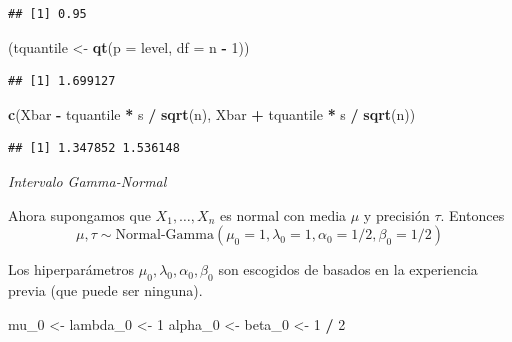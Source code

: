 \documentclass[
  12pt,
]{book}
\newenvironment{Shaded}{\begin{snugshade}}{\end{snugshade}}
\newcommand{\DataTypeTok}[1]{\textcolor[rgb]{0.13,0.29,0.53}{#1}}
\newcommand{\DecValTok}[1]{\textcolor[rgb]{0.00,0.00,0.81}{#1}}
\newcommand{\KeywordTok}[1]{\textcolor[rgb]{0.13,0.29,0.53}{\textbf{#1}}}
\newcommand{\NormalTok}[1]{#1}
\newcommand{\OperatorTok}[1]{\textcolor[rgb]{0.81,0.36,0.00}{\textbf{#1}}}
\newcommand{\StringTok}[1]{\textcolor[rgb]{0.31,0.60,0.02}{#1}}
\begin{document}
\begin{verbatim}
## [1] 0.95
\end{verbatim}

\begin{Shaded}
\begin{Highlighting}[]
\NormalTok{(tquantile \textless{}{-}}\StringTok{ }\KeywordTok{qt}\NormalTok{(}\DataTypeTok{p =}\NormalTok{ level, }\DataTypeTok{df =}\NormalTok{ n }\OperatorTok{{-}}\StringTok{ }\DecValTok{1}\NormalTok{))}
\end{Highlighting}
\end{Shaded}

\begin{verbatim}
## [1] 1.699127
\end{verbatim}

\begin{Shaded}
\begin{Highlighting}[]
\KeywordTok{c}\NormalTok{(Xbar }\OperatorTok{{-}}\StringTok{ }\NormalTok{tquantile }\OperatorTok{*}\StringTok{ }\NormalTok{s }\OperatorTok{/}\StringTok{ }\KeywordTok{sqrt}\NormalTok{(n), Xbar }\OperatorTok{+}\StringTok{ }\NormalTok{tquantile }\OperatorTok{*}\StringTok{ }\NormalTok{s }\OperatorTok{/}\StringTok{ }\KeywordTok{sqrt}\NormalTok{(n))}
\end{Highlighting}
\end{Shaded}

\begin{verbatim}
## [1] 1.347852 1.536148
\end{verbatim}

\emph{Intervalo Gamma-Normal}

Ahora supongamos que \(X_1,\dots, X_n\) es normal con media
\(\mu\) y precisión
\(\tau\). Entonces
\[\mu,\tau \sim
\text{Normal-Gamma}(\mu_0 = 1, \lambda_0 = 1,\alpha_0 = 1/2, \beta_0 = 1/2)\]

Los hiperparámetros \(\mu_0,\lambda_0, \alpha_0, \beta_0\) son escogidos de
basados en la experiencia previa (que puede ser ninguna).

\begin{Shaded}
\begin{Highlighting}[]
\NormalTok{mu\_}\DecValTok{0}\NormalTok{ \textless{}{-}}\StringTok{ }\NormalTok{lambda\_}\DecValTok{0}\NormalTok{ \textless{}{-}}\StringTok{ }\DecValTok{1}
\NormalTok{alpha\_}\DecValTok{0}\NormalTok{ \textless{}{-}}\StringTok{ }\NormalTok{beta\_}\DecValTok{0}\NormalTok{ \textless{}{-}}\StringTok{ }\DecValTok{1} \OperatorTok{/}\StringTok{ }\DecValTok{2}
\end{Highlighting}
\end{Shaded}
\end{document}
